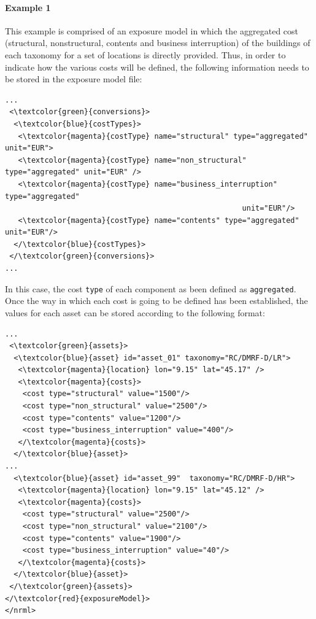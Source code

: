 \paragraph{Example 1}
This example is comprised of an \gls{exposure model} in which the aggregated cost (structural, nonstructural, contents and business interruption) of the buildings of each taxonomy for a set of locations is directly provided. Thus, in order to indicate how the various costs will be defined, the following information needs to be stored in the exposure model file:

\begin{Verbatim}[frame=single, commandchars=\\\{\}, samepage=false]
...
 <\textcolor{green}{conversions}>
  <\textcolor{blue}{costTypes}>
   <\textcolor{magenta}{costType} name="structural" type="aggregated" unit="EUR">
   <\textcolor{magenta}{costType} name="non_structural" type="aggregated" unit="EUR" />
   <\textcolor{magenta}{costType} name="business_interruption" type="aggregated" 
                                                      unit="EUR"/>
   <\textcolor{magenta}{costType} name="contents" type="aggregated" unit="EUR"/>
  </\textcolor{blue}{costTypes}>
 </\textcolor{green}{conversions}>
...
\end{Verbatim}

In this case, the cost \Verb+type+ of each component as been defined as \Verb+aggregated+. Once the way in which each cost is going to be defined has been established, the values for each asset can be stored according to the following format:

\begin{Verbatim}[frame=single, commandchars=\\\{\}, samepage=false]
...
 <\textcolor{green}{assets}>
  <\textcolor{blue}{asset} id="asset_01" taxonomy="RC/DMRF-D/LR">
   <\textcolor{magenta}{location} lon="9.15" lat="45.17" />
   <\textcolor{magenta}{costs}>
    <cost type="structural" value="1500"/>
    <cost type="non_structural" value="2500"/>
    <cost type="contents" value="1200"/>
    <cost type="business_interruption" value="400"/>
   </\textcolor{magenta}{costs}>
  </\textcolor{blue}{asset}>
...
  <\textcolor{blue}{asset} id="asset_99"  taxonomy="RC/DMRF-D/HR">
   <\textcolor{magenta}{location} lon="9.15" lat="45.12" />
   <\textcolor{magenta}{costs}>
    <cost type="structural" value="2500"/>
    <cost type="non_structural" value="2100"/>
    <cost type="contents" value="1900"/>
    <cost type="business_interruption" value="40"/>
   </\textcolor{magenta}{costs}>
  </\textcolor{blue}{asset}>
 </\textcolor{green}{assets}>
</\textcolor{red}{exposureModel}>
</nrml>
\end{Verbatim}

